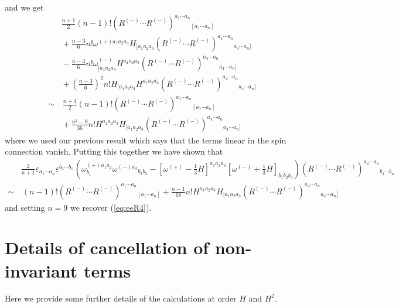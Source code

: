 \documentclass[a4paper,11pt]{article}
\begin{document}
and we get
\begin{equation}
\begin{aligned}
&
\frac{n+1}{2}(n-1)!\left(R^{(-)}\cdots R^{(-)}\right)^{a_1\cdots a_n}{}_{[a_1\cdots a_n]}
\\
&{}
+\frac{n-3}{6}n!\omega^{(+)a_1a_2a_3}H_{[a_1a_2a_3}\left(R^{(-)}\cdots R^{(-)}\right)^{a_4\cdots a_n}{}_{a_4\cdots a_n]}
\\
&{}
-\frac{n-3}{6}n!\omega^{(-)}_{[a_1a_2a_3}H^{a_1a_2a_3}\left(R^{(-)}\cdots R^{(-)}\right)^{a_4\cdots a_n}{}_{a_4\cdots a_n]}
\\
&{}
+\left(\frac{n-3}{6}\right)^2n!H_{[a_1a_2a_3}H^{a_1a_2a_3}\left(R^{(-)}\cdots R^{(-)}\right)^{a_4\cdots a_n}{}_{a_4\cdots a_n]}
\\
\sim&\,{}
\frac{n+1}{2}(n-1)!\left(R^{(-)}\cdots R^{(-)}\right)^{a_1\cdots a_n}{}_{[a_1\cdots a_n]}
\\
&{}
+\frac{n^2-9}{36}n!H^{a_1a_2a_3}H_{[a_1a_2a_3}\left(R^{(-)}\cdots R^{(-)}\right)^{a_4\cdots a_n}{}_{a_4\cdots a_n]}
\end{aligned}
\end{equation}
where we used our previous result which says that the terms linear in the spin connection vanish. Putting this together we have shown that
\begin{equation}
\begin{aligned}
&\tfrac{2}{n+1}\varepsilon_{a_1\cdots a_n}\varepsilon^{b_1\cdots b_n}
\left(\omega_{b_1}^{(+)a_1a_2}\omega^{(-)a_3}{}_{b_2b_3}-[\omega^{(+)}-\tfrac13H]^{a_1a_2a_3}[\omega^{(-)}+\tfrac13H]_{b_1b_2b_3}\right)
\left(R^{(-)}\cdots R^{(-)}\right)^{a_4\cdots a_n}{}_{b_4\cdots b_n}
\\
\sim&\,{}
(n-1)!\left(R^{(-)}\cdots R^{(-)}\right)^{a_1\cdots a_n}{}_{[a_1\cdots a_n]}
+\frac{n-1}{18}n!H^{a_1a_2a_3}H_{[a_1a_2a_3}\left(R^{(-)}\cdots R^{(-)}\right)^{a_4\cdots a_n}{}_{a_4\cdots a_n]}
\end{aligned}
\end{equation}
and setting $n=9$ we recover (\ref{eq:eeR4}).

\section{Details of cancellation of non-invariant terms}
Here we provide some further details of the calculations at order $H$ and $H^2$.
\end{document}
